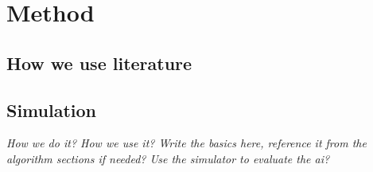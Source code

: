 




\chapter{Method}

  
  
\section{How we use literature} %


\section{Simulation}
\textit{
    How we do it?
    How we use it?
    Write the basics here, reference it from the algorithm sections if needed?
    Use the simulator to evaluate the ai?
}

